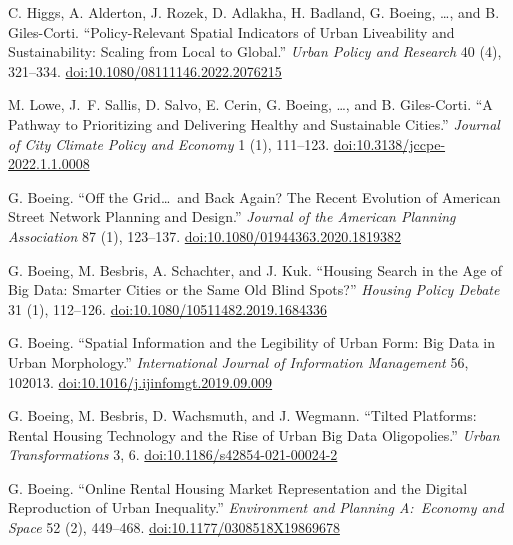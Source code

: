 \documentclass[11pt,a4paper]{report} %
\begin{document}
\begin{tablist}
\item[2022] \tab{}C. Higgs, A. Alderton, J. Rozek, D. Adlakha, H. Badland, G. Boeing, \ldots, and B. Giles-Corti. \enquote{Policy-Relevant Spatial Indicators of Urban Liveability and Sustainability: Scaling from Local to Global.} \textit{Urban Policy and Research} 40 (4), 321--334. \href{https://doi.org/10.1080/08111146.2022.2076215}{doi:10.1080/08111146.2022.2076215}

\item[2022] \tab{}M. Lowe, J.~F. Sallis, D. Salvo, E. Cerin, G. Boeing, \ldots, and B. Giles-Corti. \enquote{A Pathway to Prioritizing and Delivering Healthy and Sustainable Cities.} \textit{Journal of City Climate Policy and Economy} 1 (1), 111--123. \href{https://doi.org/10.3138/jccpe-2022.1.1.0008}{doi:10.3138/jccpe-2022.1.1.0008}

\item[2021] \tab{}G. Boeing. \enquote{Off the Grid\ldots\ and Back Again? The Recent Evolution of American Street Network Planning and Design.} \textit{Journal of the American Planning Association} 87 (1), 123--137. \href{https://doi.org/10.1080/01944363.2020.1819382}{doi:10.1080/01944363.2020.1819382}

\item[2021] \tab{}G. Boeing, M. Besbris, A. Schachter, and J. Kuk. \enquote{Housing Search in the Age of Big Data: Smarter Cities or the Same Old Blind Spots?} \textit{Housing Policy Debate} 31 (1), 112--126. \href{https://doi.org/10.1080/10511482.2019.1684336}{doi:10.1080/10511482.2019.1684336}

\item[2021] \tab{}G. Boeing. \enquote{Spatial Information and the Legibility of Urban Form: Big Data in Urban Morphology.} \textit{International Journal of Information Management} 56, 102013. \href{https://doi.org/10.1016/j.ijinfomgt.2019.09.009}{doi:10.1016/j.ijinfomgt.2019.09.009}

\item[2021] \tab{}G. Boeing, M. Besbris, D. Wachsmuth, and J. Wegmann. \enquote{Tilted Platforms: Rental Housing Technology and the Rise of Urban Big Data Oligopolies.} \textit{Urban Transformations} 3, 6. \href{https://doi.org/10.1186/s42854-021-00024-2}{doi:10.1186/s42854-021-00024-2}

\item[2020] \tab{}G. Boeing. \enquote{Online Rental Housing Market Representation and the Digital Reproduction of Urban Inequality.} \textit{Environment and Planning A:\ Economy and Space} 52 (2), 449--468. \href{https://doi.org/10.1177/0308518X19869678}{doi:10.1177/0308518X19869678}


\end{tablist}
\end{document}
